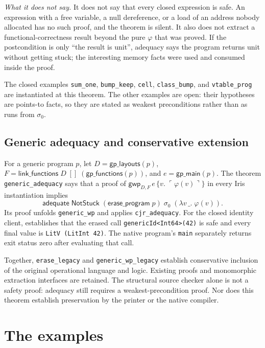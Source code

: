 \documentclass[11pt]{article}
\newcommand{\GWpre}{\mathsf{gwp}}
\newcommand{\pure}[1]{\ulcorner #1 \urcorner}
\begin{document}
\noindent\textit{What it does not say.}
It does not say that every closed expression is safe.
An expression with a free variable, a null dereference, or a load of an address nobody allocated has no such proof, and the theorem is silent.
It also does not extract a functional-correctness result beyond the pure \(\varphi\) that was proved.
If the postcondition is only ``the result is unit'', adequacy says the program returns unit without getting stuck; the interesting memory facts were used and consumed inside the proof.

The closed examples \texttt{sum\_one}, \texttt{bump\_keep}, \texttt{cell}, \texttt{class\_bump}, and \texttt{vtable\_prog} are instantiated at this theorem.
The other examples are open: their hypotheses are points-to facts, so they are stated as weakest preconditions rather than as runs from \(\sigma_0\).

\subsection{Generic adequacy and conservative extension}
\label{sec:generic-adequacy}

For a generic program \(p\), let \(D=\mathsf{gp\_layouts}(p)\),
\(F=\mathsf{link\_functions}\;D\;[]\;(\mathsf{gp\_functions}(p))\), and
\(e=\mathsf{gp\_main}(p)\). The theorem \texttt{generic\_adequacy} says
that a proof of \(\GWpre_{D,F}\,e\,\{v.\;\pure{\varphi(v)}\}\)
in every Iris instantiation implies
\[
\mathsf{adequate}\;\mathsf{NotStuck}\;
  (\mathsf{erase\_program}\;p)\;\sigma_0\;(\lambda v\,\_.\;\varphi(v)).
\]
Its proof unfolds \texttt{generic\_wp} and applies \texttt{cjr\_adequacy}.
For the closed identity client,  establishes
that the erased call \texttt{genericId<Int64>(42)} is safe and every final
value is \texttt{LitV (LitInt 42)}. The native program's \texttt{main}
separately returns exit status zero after evaluating that call.

Together, \texttt{erase\_legacy} and \texttt{generic\_wp\_legacy} establish
conservative inclusion of the original operational language and logic.
Existing proofs and monomorphic extraction interfaces are retained.
The structural source checker alone is not a safety proof: adequacy still
requires a weakest-precondition proof. Nor does this theorem establish
preservation by the printer or the native compiler.

\section{The examples}
\end{document}
